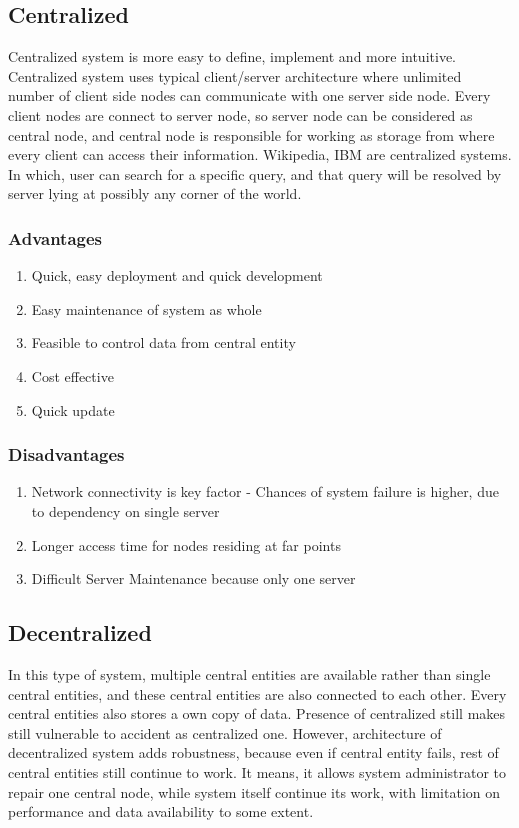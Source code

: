 \documentclass[a4paper,twoside,12pt]{report}
\begin{document}
\begin{spacing}{1.5}
\subsection{Centralized}
Centralized system is more easy to define, implement and more intuitive. Centralized system uses typical client/server architecture where unlimited number of client side nodes can communicate with one server side node. Every client nodes are connect to server node, so server node can be considered as central node, and central node is responsible for working as storage from where every client can access their information. 
Wikipedia, IBM are centralized systems. In which, user can search for a specific query, and that query will be resolved by server lying at possibly any corner of the world.
\subsubsection{Advantages}
\begin{enumerate}
\item{Quick, easy deployment and quick development}
\item{Easy maintenance of system as whole}
\item{Feasible to control data from central entity}
\item{Cost effective}
\item{Quick update}
\end{enumerate}
\subsubsection{Disadvantages}
	\begin{enumerate}
	\item{Network connectivity is key factor - Chances of system failure is higher, due to dependency on single server}
	\item{Longer access time for nodes residing at far points}
	\item{Difficult Server Maintenance because only one server}
\end{enumerate}	 
\subsection{Decentralized}
In this type of system, multiple central entities are available rather than single central entities, and these central entities are also connected to each other. Every central entities also stores a own copy of data. Presence of centralized still makes still vulnerable to accident as centralized one. However, architecture of decentralized system adds robustness, because even if central entity fails, rest of central entities still continue to work. It means, it allows system administrator to repair one central node, while system itself continue its work, with limitation on performance and data availability to some extent.   

\end{spacing}
\end{document}
